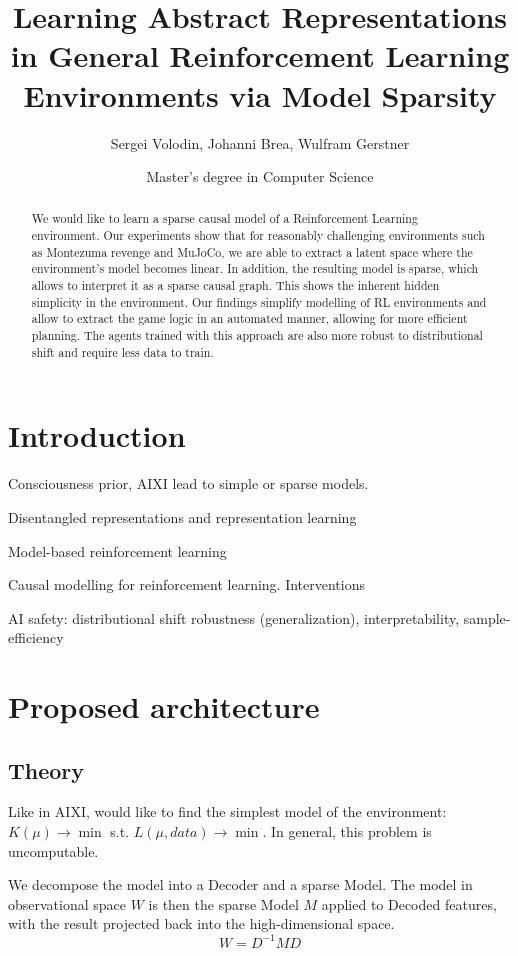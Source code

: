 \documentclass{article}
\title{Learning Abstract Representations in General Reinforcement Learning Environments via Model Sparsity}
\author{Sergei Volodin, Johanni Brea, Wulfram Gerstner}
\date{Master's degree in Computer Science}
\begin{document}
\maketitle

\begin{abstract}
We would like to learn a sparse causal model of a Reinforcement Learning environment. Our experiments show that for reasonably challenging environments such as Montezuma revenge and MuJoCo, we are able to extract a latent space where the environment's model becomes linear. In addition, the resulting model is sparse, which allows to interpret it as a sparse causal graph. This shows the inherent hidden simplicity in the environment. Our findings simplify modelling of RL environments and allow to extract the game logic in an automated manner, allowing for more efficient planning. The agents trained with this approach are also more robust to distributional shift and require less data to train.
\end{abstract}

\section{Introduction}
Consciousness prior, AIXI lead to simple or sparse models.

Disentangled representations and representation learning

Model-based reinforcement learning

Causal modelling for reinforcement learning. Interventions

AI safety: distributional shift robustness (generalization), interpretability, sample-efficiency

\section{Proposed architecture}
\subsection{Theory}
Like in AIXI, would like to find the simplest model of the environment:
$K(\mu)\to\min$ s.t. $L(\mu, data)\to\min$. In general, this problem is uncomputable.

We decompose the model into a Decoder and a sparse Model. The model in observational space $W$ is then the sparse Model $M$ applied to Decoded features, with the result projected back into the high-dimensional space.
$$
W=D^{-1}MD
$$
\end{document}
